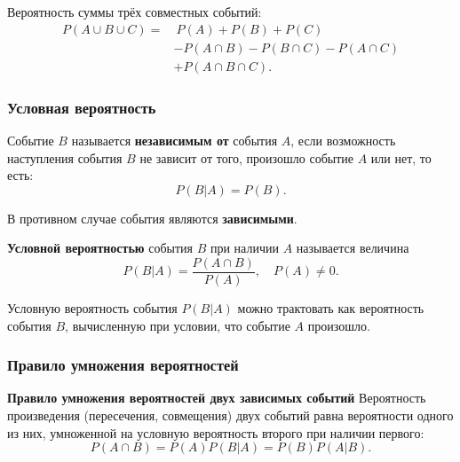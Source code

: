 \documentclass[a4paper]{article}
\newcommand{\key}[1]{{\bfseries\color{Medium} #1}}
\begin{document}
                Вероятность суммы трёх совместных событий:
                \begin{equation*}
                    \begin{aligned}
                        P (A \cup B \cup C) = &~ P(A) + P(B) + P(C) \\[1.0ex]
                        & - P(A \cap B) - P(B \cap C) - P(A \cap C) \\[1.0ex]
                        & + P(A \cap B \cap C) .
                    \end{aligned}
                \end{equation*}

            \subsubsection{Условная вероятность}

                Событие $B$ называется \key{независимым от} события $A$, если возможность наступления события $B$ не зависит от того, произошло событие $A$ или нет, то есть:
                \begin{equation*}
                    P(B | A) = P(B) .
                \end{equation*}

                В противном случае события являются \key{зависимыми}.

                \key{Условной вероятностью} события $B$ при наличии $A$ называется величина
                \begin{equation*}
                    P(B | A) = \frac{P(A \cap B)}{P(A)} , \quad P(A) \neq 0 .
                \end{equation*}

                Условную вероятность события $P(B | A)$ можно трактовать как вероятность события $B$, вычисленную при условии, что событие $A$ произошло.

            \subsubsection{Правило умножения вероятностей}

                \key{Правило умножения вероятностей двух зависимых событий} \newline
                Вероятность произведения (пересечения, совмещения) двух событий равна вероятности одного из них, умноженной на условную вероятность второго при наличии первого:
                \begin{equation*}
                    P(A \cap B) = P(A) P(B | A) = P(B) P(A | B) .
                \end{equation*}
\end{document}
